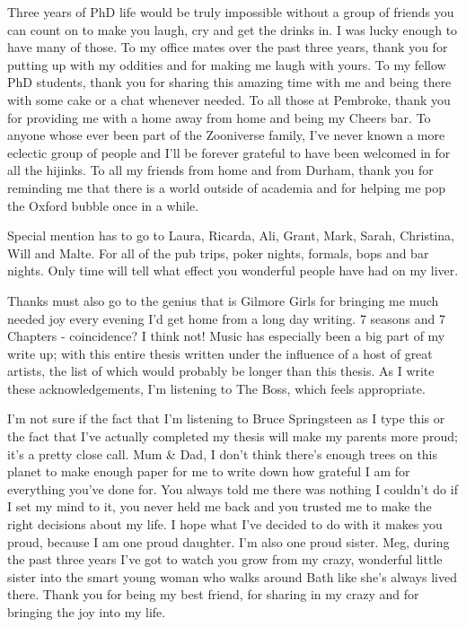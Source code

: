 \documentclass[12pt,useAMS]{ociamthesis}  %
\begin{document}
\begin{acknowledgementslong}
Three years of PhD life would be truly impossible without a group of friends you can count on to make you laugh, cry and get the drinks in. I was lucky enough to have many of those. To my office mates over the past three years, thank you for putting up with my oddities and for making me laugh with yours. To my fellow PhD students, thank you for sharing this amazing time with me and being there with some cake or a chat whenever needed. To all those at Pembroke, thank you for providing me with a home away from home and being my Cheers bar. To anyone whose ever been part of the Zooniverse family, I've never known a more eclectic group of people and I'll be forever grateful to have been welcomed in for all the hijinks. To all my friends from home and from Durham, thank you for reminding me that there is a world outside of academia and for helping me pop the Oxford bubble once in a while.

Special mention has to go to Laura, Ricarda, Ali, Grant, Mark, Sarah, Christina, Will and Malte. For all of the pub trips, poker nights, formals, bops and bar nights. Only time will tell what effect you wonderful people have had on my liver.

Thanks must also go to the genius that is Gilmore Girls for bringing me much needed joy every evening I'd get home from a long day writing. 7 seasons and 7 Chapters - coincidence? I think not! Music has especially been a big part of my write up; with this entire thesis written under the influence of a host of great artists, the list of which would probably be longer than this thesis. As I write these acknowledgements, I'm listening to The Boss, which feels appropriate. 

I'm not sure if the fact that I'm listening to Bruce Springsteen as I type this or the fact that I've actually completed my thesis will make my parents more proud; it's a pretty close call. Mum \& Dad, I don't think there's enough trees on this planet to make enough paper for me to write down how grateful I am for everything you've done for. You always told me there was nothing I couldn't do if I set my mind to it, you never held me back and you trusted me to make the right decisions about my life. I hope what I've decided to do with it makes you proud, because I am one proud daughter. I'm also one proud sister. Meg, during the past three years I've got to watch you grow from my crazy, wonderful little sister into the smart young woman who walks around Bath like she's always lived there. Thank you for being my best friend, for sharing in my crazy and for bringing the joy into my life. 


\end{acknowledgementslong}
\end{document}
